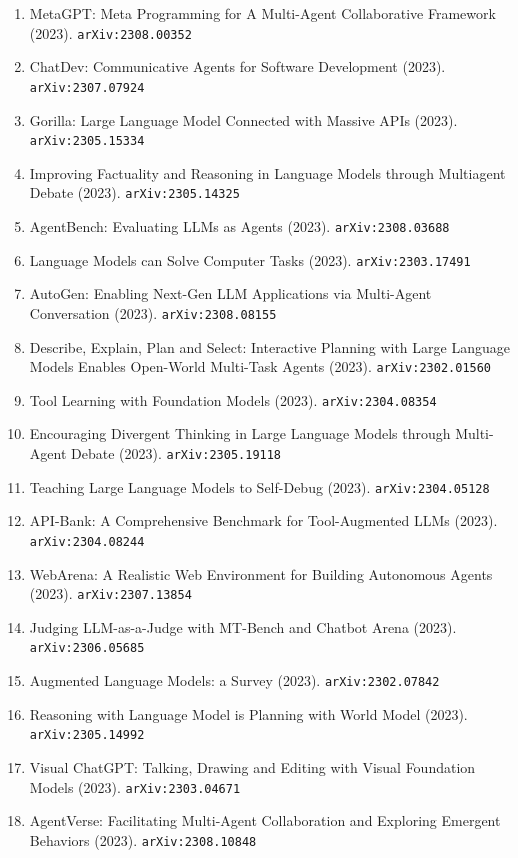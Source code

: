 \documentclass[11pt]{article}
\begin{document}
\begin{enumerate}
  \item MetaGPT: Meta Programming for A Multi-Agent Collaborative Framework (2023). \texttt{arXiv:2308.00352}
  \item ChatDev: Communicative Agents for Software Development (2023). \texttt{arXiv:2307.07924}
  \item Gorilla: Large Language Model Connected with Massive APIs (2023). \texttt{arXiv:2305.15334}
  \item Improving Factuality and Reasoning in Language Models through Multiagent
  Debate (2023). \texttt{arXiv:2305.14325}
  \item AgentBench: Evaluating LLMs as Agents (2023). \texttt{arXiv:2308.03688}
  \item Language Models can Solve Computer Tasks (2023). \texttt{arXiv:2303.17491}
  \item AutoGen: Enabling Next-Gen LLM Applications via Multi-Agent Conversation (2023). \texttt{arXiv:2308.08155}
  \item Describe, Explain, Plan and Select: Interactive Planning with Large
  Language Models Enables Open-World Multi-Task Agents (2023). \texttt{arXiv:2302.01560}
  \item Tool Learning with Foundation Models (2023). \texttt{arXiv:2304.08354}
  \item Encouraging Divergent Thinking in Large Language Models through
  Multi-Agent Debate (2023). \texttt{arXiv:2305.19118}
  \item Teaching Large Language Models to Self-Debug (2023). \texttt{arXiv:2304.05128}
  \item API-Bank: A Comprehensive Benchmark for Tool-Augmented LLMs (2023). \texttt{arXiv:2304.08244}
  \item WebArena: A Realistic Web Environment for Building Autonomous Agents (2023). \texttt{arXiv:2307.13854}
  \item Judging LLM-as-a-Judge with MT-Bench and Chatbot Arena (2023). \texttt{arXiv:2306.05685}
  \item Augmented Language Models: a Survey (2023). \texttt{arXiv:2302.07842}
  \item Reasoning with Language Model is Planning with World Model (2023). \texttt{arXiv:2305.14992}
  \item Visual ChatGPT: Talking, Drawing and Editing with Visual Foundation
  Models (2023). \texttt{arXiv:2303.04671}
  \item AgentVerse: Facilitating Multi-Agent Collaboration and Exploring
  Emergent Behaviors (2023). \texttt{arXiv:2308.10848}

\end{enumerate}
\end{document}
